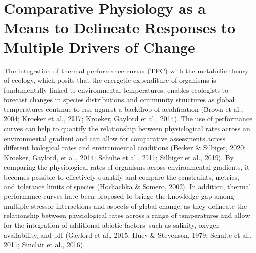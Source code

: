 \documentclass{CSUNthesis}
\begin{document}
\section*{Comparative Physiology as a Means to Delineate Responses to Multiple Drivers of Change}\label{comparative-physiology-as-a-means-to-delineate-responses-to-multiple-drivers-of-change}

The integration of thermal performance curves (TPC) with the metabolic theory of ecology, which posits that the energetic expenditure of organisms is fundamentally linked to environmental temperatures, enables ecologists to forecast changes in species distributions and community structures as global temperatures continue to rise against a backdrop of acidification (Brown et al., 2004; Kroeker et al., 2017; Kroeker, Gaylord et al., 2014). The use of performance curves can help to quantify the relationship between physiological rates across an environmental gradient and can allow for comparative assessments across different biological rates and environmental conditions (Becker \& Silbiger, 2020; Kroeker, Gaylord, et al., 2014; Schulte et al., 2011; Silbiger et al., 2019). By comparing the physiological rates of organisms across environmental gradients, it becomes possible to effectively quantify and compare the constraints, metrics, and tolerance limits of species (Hochachka \& Somero, 2002). In addition, thermal performance curves have been proposed to bridge the knowledge gap among multiple stressor interactions and aspects of global change, as they delineate the relationship between physiological rates across a range of temperatures and allow for the integration of additional abiotic factors, such as salinity, oxygen availability, and pH (Gaylord et al., 2015; Huey \& Stevenson, 1979; Schulte et al., 2011; Sinclair et al., 2016).
\end{document}
